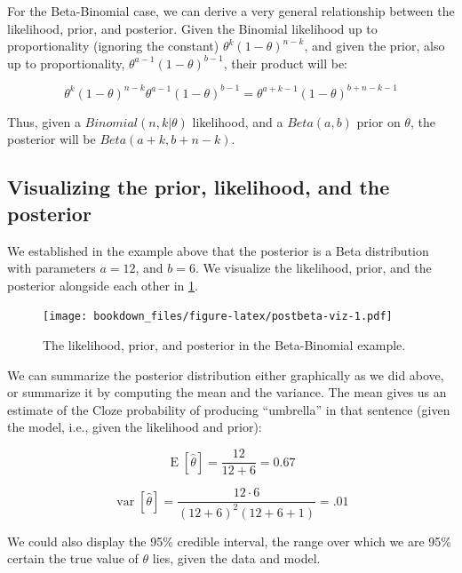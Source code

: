 \documentclass[12pt,]{krantz}
\theoremstyle{definition}
\theoremstyle{definition}
\theoremstyle{definition}
\theoremstyle{remark}
\begin{document}
For the Beta-Binomial case, we can derive a very general relationship between the likelihood, prior, and posterior. Given the Binomial likelihood up to proportionality (ignoring the constant) \(\theta^k (1-\theta)^{n-k}\), and given the prior, also up to proportionality, \(\theta^{a-1} (1-\theta)^{b-1}\), their product will be:

\begin{equation}
\theta^k (1-\theta)^{n-k} \theta^{a-1} (1-\theta)^{b-1} = \theta^{a+k-1} (1-\theta)^{b+n-k-1} 
\end{equation}

Thus, given a \(Binomial(n,k|\theta)\) likelihood, and a \(Beta(a,b)\) prior on \(\theta\), the posterior will be \(Beta(a+k,b+n-k)\).

\hypertarget{visualizing-the-prior-likelihood-and-the-posterior}{%
\subsection{Visualizing the prior, likelihood, and the posterior}\label{visualizing-the-prior-likelihood-and-the-posterior}}

We established in the example above that the posterior is a Beta distribution with parameters \(a=12\), and \(b = 6\). We visualize the likelihood, prior, and the posterior alongside each other in \ref{fig:postbeta-viz}.

\begin{figure}
\centering
\texttt{[image: bookdown\_files/figure-latex/postbeta-viz-1.pdf]}
\caption{\label{fig:postbeta-viz}The likelihood, prior, and posterior in the Beta-Binomial example.}
\end{figure}

We can summarize the posterior distribution either graphically as we did above, or summarize it by computing the mean and the variance. The mean gives us an estimate of the Cloze probability of producing ``umbrella'' in that sentence (given the model, i.e., given the likelihood and prior):

\begin{equation}
\operatorname{E}[\hat\theta] = \frac{12}{12+6}=0.67
\label{eq:meanPb}
\end{equation}

\begin{equation}
\operatorname{var}[\hat\theta]=\frac {12 \cdot 6 }{(12 + 6 )^{2}(12 + 6 +1)}= .01
\label{eq:varPb}
\end{equation}

We could also display the 95\% credible interval, the range over which we are 95\% certain the true value of \(\theta\) lies, given the data and model.
\end{document}

